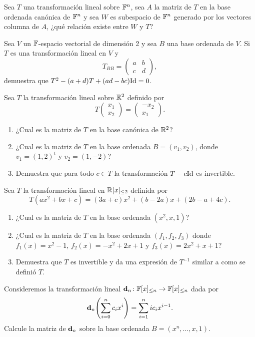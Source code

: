 \begin{exerciselist}
  \item Sea $T$ una transformación lineal sobre $\mathbb{F}^n$, sea $A$ la matriz de $T$ en la base ordenada canónica de $\mathbb{F}^n$ y sea $W$ es subespacio de $\mathbb{F}^n$ generado por los vectores columna de $A$, ¿qué relación existe entre $W$ y $T$?
  
  \item Sea $V$ un $\mathbb{F}$-espacio vectorial de dimensión 2 y sea $B$ una base ordenada de $V$. Si $T$ es una transformación lineal en $V$ y 
    \[ T_{BB} = \begin{pmatrix}
      a & b \\ c & d
    \end{pmatrix}, \]
    demuestra que $T^2 - (a+d)T + (ad-bc)\mathrm{Id} = 0$.

  \item Sea $T$ la transformación lineal sobre $\mathbb{R}^2$ definido por
    \[ T\begin{pmatrix} x_1 \\ x_2 \end{pmatrix} = \begin{pmatrix} -x_2 \\ x_1 \end{pmatrix}. \]
    \begin{enumerate}
      \item ¿Cual es la matriz de $T$ en la base canónica de $\mathbb{R}^2$?
      \item ¿Cual es la matriz de $T$ en la base ordenada $B = (v_1, v_2)$, donde $v_1 = (1,2)^t$ y $v_2 = (1, -2)$?
      \item Demuestra que para todo $c \in T$ la transformación $T - c\mathrm{Id}$ es invertible.
    \end{enumerate}
    
  \item Sea $T$ la transformación lineal en $\mathbb{R}[x]_{\leq 2}$ definida por
    \[ T(ax^2+bx+c) = (3a+c)x^2 + (b-2a)x + (2b-a+4c). \]
    \begin{enumerate}
      \item ¿Cual es la matriz de $T$ en la base ordenada $(x^2, x, 1)$?
      \item ¿Cual es la matriz de $T$ en la base ordenada $(f_1, f_2, f_3)$ donde $f_1(x) = x^2-1$, $f_2(x) = -x^2+2x+1$ y $f_3(x) = 2x^2 +x +1$?
      \item Demuestra que $T$ es invertible y da una expresión de $T^{-1}$ similar a como se definió $T$.
    \end{enumerate}

  \item Consideremos la transformación lineal $\mathbf{d}_n \colon \mathbb{F}[x]_{\leq n} \to \mathbb{F}[x]_{\leq n}$ dada por
    \[ \bec d_n \paren{\sum_{i=0}^n c_ix^i} = \sum_{i=1}^n ic_ix^{i-1}. \]
    Calcule la matriz de $\mathbf{d}_n$ sobre la base ordenada $B = (x^n, \ldots, x, 1)$.
\end{exerciselist}